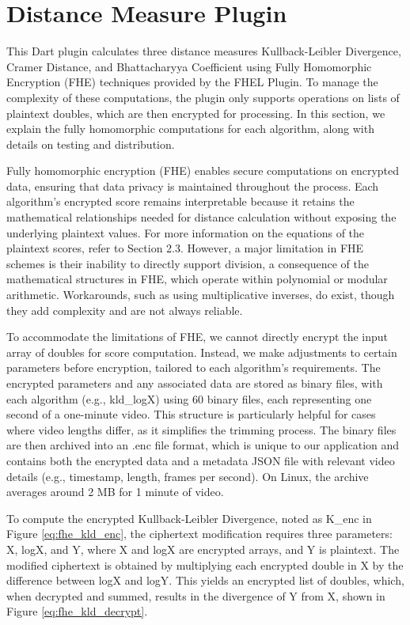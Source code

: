 \section{Distance Measure Plugin}

This Dart plugin calculates three distance measures Kullback-Leibler Divergence, Cramer Distance, and Bhattacharyya Coefficient using Fully Homomorphic Encryption (FHE) techniques provided by the FHEL Plugin. To manage the complexity of these computations, the plugin only supports operations on lists of plaintext doubles, which are then encrypted for processing. In this section, we explain the fully homomorphic computations for each algorithm, along with details on testing and distribution.

Fully homomorphic encryption (FHE) enables secure computations on encrypted data, ensuring that data privacy is maintained throughout the process. Each algorithm’s encrypted score remains interpretable because it retains the mathematical relationships needed for distance calculation without exposing the underlying plaintext values. For more information on the equations of the plaintext scores, refer to Section 2.3. However, a major limitation in FHE schemes is their inability to directly support division, a consequence of the mathematical structures in FHE, which operate within polynomial or modular arithmetic. Workarounds, such as using multiplicative inverses, do exist, though they add complexity and are not always reliable.

To accommodate the limitations of FHE, we cannot directly encrypt the input array of doubles for score computation. Instead, we make adjustments to certain parameters before encryption, tailored to each algorithm’s requirements. The encrypted parameters and any associated data are stored as binary files, with each algorithm (e.g., kld\_logX) using 60 binary files, each representing one second of a one-minute video. This structure is particularly helpful for cases where video lengths differ, as it simplifies the trimming process. The binary files are then archived into an .enc file format, which is unique to our application and contains both the encrypted data and a metadata JSON file with relevant video details (e.g., timestamp, length, frames per second). On Linux, the archive averages around 2 MB for 1 minute of video.

To compute the encrypted Kullback-Leibler Divergence, noted as K\_enc in Figure \ref{eq:fhe_kld_enc}, the ciphertext modification requires three parameters: X, logX, and Y, where X and logX are encrypted arrays, and Y is plaintext. The modified ciphertext is obtained by multiplying each encrypted double in X by the difference between logX and logY. This yields an encrypted list of doubles, which, when decrypted and summed, results in the divergence of Y from X, shown in Figure \ref{eq:fhe_kld_decrypt}.

